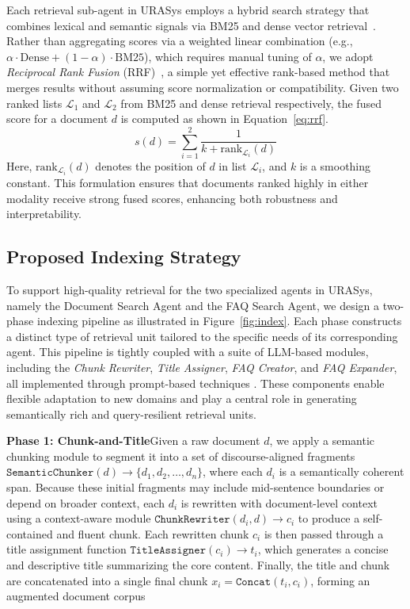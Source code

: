 \documentclass[11pt]{article}
\begin{document}
Each retrieval sub-agent in URASys employs a hybrid search strategy that combines lexical and semantic signals via BM25 and dense vector retrieval~\cite{10.1145/3637528.3671470}. Rather than aggregating scores via a weighted linear combination (e.g., $\alpha \cdot \text{Dense} + (1 - \alpha) \cdot \text{BM25}$), which requires manual tuning of $\alpha$, we adopt \textit{Reciprocal Rank Fusion} (RRF)~\cite{10.1145/1571941.1572114}, a simple yet effective rank-based method that merges results without assuming score normalization or compatibility. Given two ranked lists $\mathcal{L}_1$ and $\mathcal{L}_2$ from BM25 and dense retrieval respectively, the fused score for a document $d$ is computed as shown in Equation~\ref{eq:rrf}.
\begin{equation}
s(d) = \sum_{i=1}^{2} \frac{1}{k + \text{rank}_{\mathcal{L}_i}(d)}
\label{eq:rrf}
\end{equation}
Here, $\text{rank}_{\mathcal{L}_i}(d)$ denotes the position of $d$ in list $\mathcal{L}_i$, and $k$ is a smoothing constant. This formulation ensures that documents ranked highly in either modality receive strong fused scores, enhancing both robustness and interpretability. 

\subsection{Proposed Indexing Strategy}
\label{sec:indexing-strategy}

To support high-quality retrieval for the two specialized agents in URASys, namely the Document Search Agent and the FAQ Search Agent, we design a two-phase indexing pipeline as illustrated in Figure~\ref{fig:index}. Each phase constructs a distinct type of retrieval unit tailored to the specific needs of its corresponding agent. This pipeline is tightly coupled with a suite of LLM-based modules, including the \textit{Chunk Rewriter}, \textit{Title Assigner}, \textit{FAQ Creator}, and \textit{FAQ Expander}, all implemented through prompt-based techniques \cite{Kamath2024}. These components enable flexible adaptation to new domains and play a central role in generating semantically rich and query-resilient retrieval units.

\smallskip
\noindent
\textbf{Phase 1: Chunk-and-Title}\quad Given a raw document $d$, we apply a semantic chunking module to segment it into a set of discourse-aligned fragments $\texttt{SemanticChunker}(d) \rightarrow \{d_1, d_2, \dots, d_n\}$, where each $d_i$ is a semantically coherent span. Because these initial fragments may include mid-sentence boundaries or depend on broader context, each $d_i$ is rewritten with document-level context using a context-aware module $\texttt{ChunkRewriter}(d_i, d) \rightarrow c_i$ to produce a self-contained and fluent chunk. Each rewritten chunk $c_i$ is then passed through a title assignment function $\texttt{TitleAssigner}(c_i) \rightarrow t_i$, which generates a concise and descriptive title summarizing the core content. Finally, the title and chunk are concatenated into a single final chunk $x_i = \texttt{Concat}(t_i, c_i)$, forming an augmented document corpus
\end{document}
